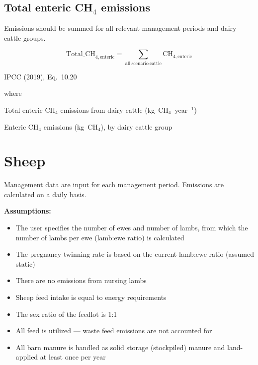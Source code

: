 \subsection{Total enteric CH\texorpdfstring{$_4$}{4} emissions}
\label{subsec:dairy-total}

Emissions should be summed for all relevant management periods and dairy cattle groups.

\begin{equation}
    \mathrm{Total\_CH}_{4,\mathrm{enteric}} =
        \sum_{\mathrm{all\ scenario\ cattle}}
        \mathrm{CH}_{4,\mathrm{enteric}}
    \tag{Eq.\ 3.2.3.1}
\end{equation}

\noindent IPCC (2019), Eq.~10.20

\noindent where
\begin{description}[font=\normalfont, leftmargin=9em, style=sameline, nosep]
    \item[$\mathrm{Total\_CH}_{4,\mathrm{enteric}}$] Total enteric CH$_4$ emissions
          from dairy cattle (kg~CH$_4$~year$^{-1}$)
    \item[$\mathrm{CH}_{4,\mathrm{enteric}}$] Enteric CH$_4$ emissions (kg~CH$_4$),
          by dairy cattle group
\end{description}

\section{Sheep}
\label{sec:sheep}

Management data are input for each management period. Emissions are calculated
on a daily basis.

\noindent\textbf{Assumptions:}
\begin{itemize}[leftmargin=1.5em]
    \item The user specifies the number of ewes and number of lambs, from which the
          number of lambs per ewe (lamb:ewe ratio) is calculated
    \item The pregnancy twinning rate is based on the current lamb:ewe ratio
          (assumed static)
    \item There are no emissions from nursing lambs
    \item Sheep feed intake is equal to energy requirements
    \item The sex ratio of the feedlot is 1:1
    \item All feed is utilized --- waste feed emissions are not accounted for
    \item All barn manure is handled as solid storage (stockpiled) manure and
          land-applied at least once per year
\end{itemize}

